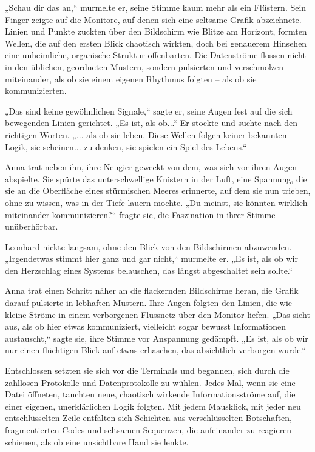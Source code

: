 \documentclass[
]{article}
\begin{document}
„Schau dir das an,`` murmelte er, seine Stimme kaum mehr als ein
Flüstern. Sein Finger zeigte auf die Monitore, auf denen sich eine
seltsame Grafik abzeichnete. Linien und Punkte zuckten über den
Bildschirm wie Blitze am Horizont, formten Wellen, die auf den ersten
Blick chaotisch wirkten, doch bei genauerem Hinsehen eine unheimliche,
organische Struktur offenbarten. Die Datenströme flossen nicht in den
üblichen, geordneten Mustern, sondern pulsierten und verschmolzen
miteinander, als ob sie einem eigenen Rhythmus folgten -- als ob sie
kommunizierten.

„Das sind keine gewöhnlichen Signale,`` sagte er, seine Augen fest auf
die sich bewegenden Linien gerichtet. „Es ist, als ob...`` Er stockte
und suchte nach den richtigen Worten. „... als ob sie leben. Diese
Wellen folgen keiner bekannten Logik, sie scheinen... zu denken, sie
spielen ein Spiel des Lebens.``

Anna trat neben ihn, ihre Neugier geweckt von dem, was sich vor ihren
Augen abspielte. Sie spürte das unterschwellige Knistern in der Luft,
eine Spannung, die sie an die Oberfläche eines stürmischen Meeres
erinnerte, auf dem sie nun trieben, ohne zu wissen, was in der Tiefe
lauern mochte. „Du meinst, sie könnten wirklich miteinander
kommunizieren?{\kern0pt}`` fragte sie, die Faszination in ihrer Stimme
unüberhörbar.

Leonhard nickte langsam, ohne den Blick von den Bildschirmen abzuwenden.
„Irgendetwas stimmt hier ganz und gar nicht,`` murmelte er. „Es ist, als
ob wir den Herzschlag eines Systems belauschen, das längst abgeschaltet
sein sollte.``

Anna trat einen Schritt näher an die flackernden Bildschirme heran, die
Grafik darauf pulsierte in lebhaften Mustern. Ihre Augen folgten den
Linien, die wie kleine Ströme in einem verborgenen Flussnetz über den
Monitor liefen. „Das sieht aus, als ob hier etwas kommuniziert,
vielleicht sogar bewusst Informationen austauscht,`` sagte sie, ihre
Stimme vor Anspannung gedämpft. „Es ist, als ob wir nur einen flüchtigen
Blick auf etwas erhaschen, das absichtlich verborgen wurde.``

Entschlossen setzten sie sich vor die Terminals und begannen, sich durch
die zahllosen Protokolle und Datenprotokolle zu wühlen. Jedes Mal, wenn
sie eine Datei öffneten, tauchten neue, chaotisch wirkende
Informationsströme auf, die einer eigenen, unerklärlichen Logik folgten.
Mit jedem Mausklick, mit jeder neu entschlüsselten Zeile entfalten sich
Schichten aus verschlüsselten Botschaften, fragmentierten Codes und
seltsamen Sequenzen, die aufeinander zu reagieren schienen, als ob eine
unsichtbare Hand sie lenkte.
\end{document}
